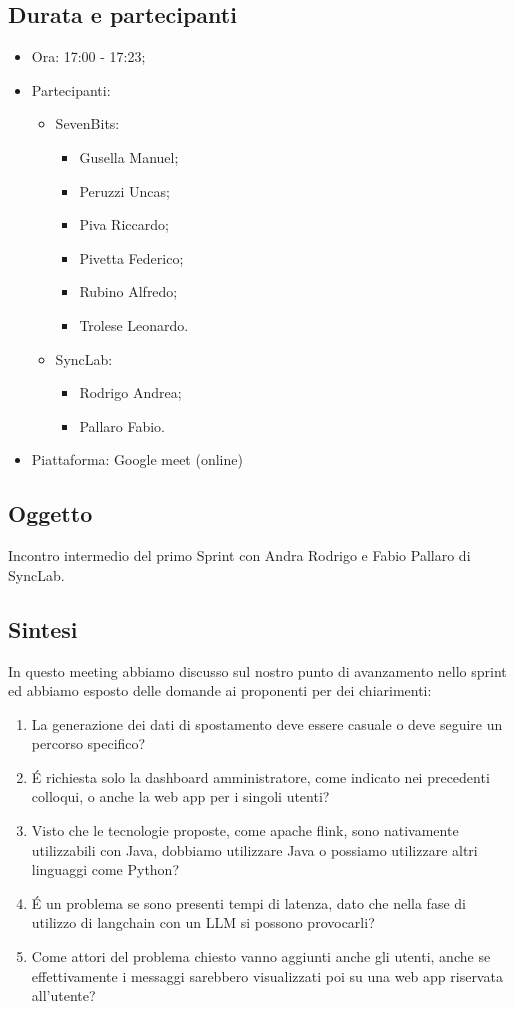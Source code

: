 \documentclass[12pt]{article}
\begin{document}
\subsection{Durata e partecipanti}
\begin{itemize}
\item Ora: 17:00 - 17:23;
\item Partecipanti: 	
	\begin{itemize}
        \item SevenBits:
        \begin{itemize}
			\item Gusella Manuel;
			\item Peruzzi Uncas;
			\item Piva Riccardo;
			\item Pivetta Federico;
			\item Rubino Alfredo;
			\item Trolese Leonardo.
		\end{itemize}
		\item SyncLab:
		\begin{itemize}
			\item Rodrigo Andrea;
			\item Pallaro Fabio.
		\end{itemize}
	\end{itemize}
\item Piattaforma: Google meet (online)
\end{itemize}
\subsection{Oggetto}
Incontro intermedio del primo Sprint con Andra Rodrigo e Fabio Pallaro di SyncLab.

\subsection{Sintesi}
In questo meeting abbiamo discusso sul nostro punto di avanzamento nello sprint ed abbiamo esposto delle domande ai proponenti per dei chiarimenti:\\
\begin{enumerate}
\item \label{uno} La generazione dei dati di spostamento deve essere casuale o deve seguire un percorso specifico?
\item \label{due} \'E richiesta solo la dashboard amministratore, come indicato nei precedenti colloqui, o anche la web app per i singoli utenti?
\item \label{tre} Visto che le tecnologie proposte, come apache flink, sono nativamente utilizzabili con Java, dobbiamo utilizzare Java o possiamo utilizzare altri linguaggi come Python?
\item \label{quattro} \'E un problema se sono presenti tempi di latenza, dato che nella fase di utilizzo di langchain con un LLM si possono provocarli?
\item \label{cinque} Come attori del problema chiesto vanno aggiunti anche gli utenti, anche se effettivamente i messaggi sarebbero visualizzati poi su una web app riservata all'utente?
\end{enumerate}
\end{document}
